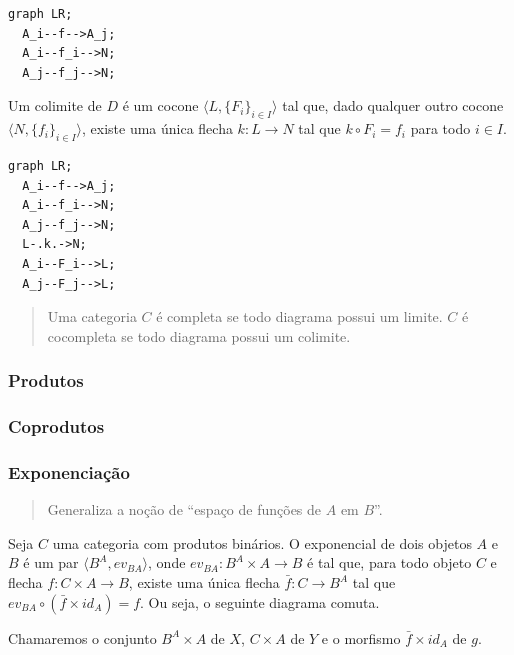 \begin{verbatim}
graph LR;
  A_i--f-->A_j;
  A_i--f_i-->N;
  A_j--f_j-->N;
\end{verbatim}

Um colimite de \(D\) é um cocone
\(\langle L, \{ F_i \}_{i\in I} \rangle\) tal que, dado qualquer outro
cocone \(\langle N, \{ f_i \}_{i \in I} \rangle\), existe uma única
flecha \(k : L \rightarrow N\) tal que \(k \circ F_i = f_i\) para todo
\(i \in I\).

\begin{verbatim}
graph LR;
  A_i--f-->A_j;
  A_i--f_i-->N;
  A_j--f_j-->N;
  L-.k.->N;
  A_i--F_i-->L;
  A_j--F_j-->L;
\end{verbatim}

\begin{quote}
Uma categoria \(C\) é completa se todo diagrama possui um limite. \(C\)
é cocompleta se todo diagrama possui um colimite.
\end{quote}

\hypertarget{produtos}{%
\subsubsection{Produtos}\label{produtos}}

\hypertarget{coprodutos}{%
\subsubsection{Coprodutos}\label{coprodutos}}

\hypertarget{exponenciauxe7uxe3o}{%
\subsubsection{Exponenciação}\label{exponenciauxe7uxe3o}}

\begin{quote}
Generaliza a noção de ``espaço de funções de \(A\) em \(B\)''.
\end{quote}

Seja \(C\) uma categoria com produtos binários. O exponencial de dois
objetos \(A\) e \(B\) é um par \(\langle B^A , ev_{BA} \rangle\), onde
\(ev_{BA} : B^A \times A \rightarrow B\) é tal que, para todo objeto
\(C\) e flecha \(f : C \times A \rightarrow B\), existe uma única flecha
\(\bar{f} : C \rightarrow B^A\) tal que
\(ev_{BA} \circ (\bar{f} \times id_A) = f\). Ou seja, o seguinte
diagrama comuta.

Chamaremos o conjunto \(B^A \times A\) de \(X\), \(C \times A\) de \(Y\)
e o morfismo \(\bar{f} \times id_A\) de \(g\).

